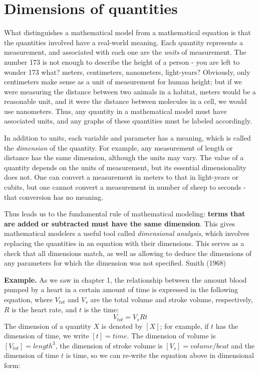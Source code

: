 \documentclass[
  letterpaper,
  DIV=11,
  numbers=noendperiod]{scrreprt}
\begin{document}
\hypertarget{sec-model2}{%
\section{Dimensions of quantities}\label{sec-model2}}

What distinguishes a mathematical model from a mathematical equation is
that the quantities involved have a real-world meaning. Each quantity
represents a measurement, and associated with each one are the
 \emph{units} of measurement. The number 173 is not enough
to describe the height of a person - you are left to wonder 173 what?
meters, centimeters, nanometers, light-years? Obviously, only
centimeters make sense as a unit of measurement for human height; but if
we were measuring the distance between two animals in a habitat, meters
would be a reasonable unit, and it were the distance between molecules
in a cell, we would use nanometers. Thus, any quantity in a mathematical
model must have associated units, and any graphs of these quantities
must be labeled accordingly.

In addition to units, each variable and parameter has a meaning, which
is called the  \emph{dimension} of the quantity. For
example, any measurement of length or distance has the same dimension,
although the units may vary. The value of a quantity depends on the
units of measurement, but its essential dimensionality does not. One can
convert a measurement in meters to that in light-years or cubits, but
one cannot convert a measurement in number of sheep to seconds - that
conversion has no meaning.

Thus leads us to the fundamental rule of mathematical modeling:
\textbf{terms that are added or subtracted must have the same
dimension}. This gives mathematical modelers a useful tool called
 \emph{dimensional analysis}, which involves
replacing the quantities in an equation with their dimensions. This
serves as a check that all dimensions match, as well as allowing to
deduce the dimensions of any parameters for which the dimension was not
specified. Smith (1968)

\textbf{Example.} As we saw in chapter 1, the relationship between the
amount blood pumped by a heart in a certain amount of time is expressed
in the following equation, where \(V_{tot}\) and \(V_s\) are the total
volume and stroke volume, respectively, \(R\) is the heart rate, and
\(t\) is the time: \[
V_{tot} = V_sRt
\] The dimension of a quantity \(X\) is denoted by \([X]\); for example,
if \(t\) has the dimension of time, we write \([t] = time\). The
dimension of volume is \([V_{tot}] = length^3\), the dimension of stroke
volume is \([V_s] = volume/beat\) and the dimension of time \(t\) is
time, so we can re-write the equation above in dimensional form:
\end{document}
